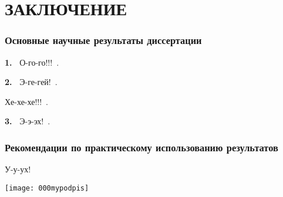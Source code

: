 \chapter*{\normalsize ЗАКЛЮЧЕНИЕ}

\vspace{-10pt}
\subsection*{Основные научные результаты диссертации}

\vspace{-16pt}
\textbf{1.~}
О-го-го!!!~\cite{myarticle1, myarticle2}.


\textbf{2.~}
Э-ге-гей!~\cite{myarticle3, myarticle4, myarticle5}.

Хе-хе-хе!!!~\cite{myarticle4, myarticle5}.


\textbf{3.~}
Э-э-эх!~\cite{myarticle6}.




\vspace{-10pt}
\subsection*{Рекомендации по практическому использованию результатов}

\vspace{-16pt}

У-у-ух!\vspace{-17pt} \begin{flushright} \texttt{[image: 000mypodpis]} \end{flushright}
